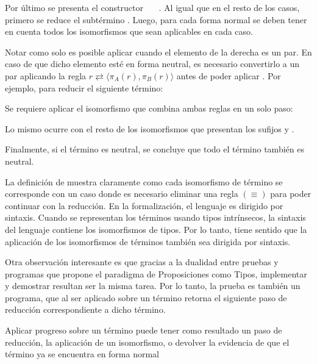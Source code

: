 
Por último se presenta el constructor \const{[}~~\const{]≡}~.
Al igual que en el resto de los casos, primero se reduce el subtérmino .
Luego, para cada forma normal se deben tener en cuenta todos los isomorfismos que sean aplicables en cada caso.


Notar como solo es posible aplicar  cuando el elemento de la derecha es un par.
En caso de que dicho elemento esté en forma neutral, es necesario convertirlo a un par aplicando la regla $r \rightleftarrows \langle \pi_A (r), \pi_B(r) \rangle$ antes de poder aplicar .
Por ejemplo, para reducir el siguiente término:


Se requiere aplicar el isomorfismo  que combina ambas reglas en un solo paso:


Lo mismo ocurre con el resto de los isomorfismos que presentan los sufijos  y \const{$\eta$}.

Finalmente, si el término  es neutral, se concluye que todo el término también es neutral.

La definición de  muestra claramente como cada isomorfismo de término se corresponde con un caso donde es necesario eliminar una regla $(\equiv)$ para poder continuar con la reducción.
En la formalización, el lenguaje es dirigido por sintaxis.
Cuando se representan los términos usando tipos intrínsecos, la sintaxis del lenguaje contiene los isomorfismos de tipos.
Por lo tanto, tiene sentido que la aplicación de los isomorfismos de términos también sea dirigida por sintaxis.

Otra observación interesante es que gracias a la dualidad entre pruebas y programas que propone el paradigma de Proposiciones como Tipos, implementar y demostrar resultan ser la misma tarea.
Por lo tanto, la prueba  es también un programa, que al ser aplicado sobre un término retorna el siguiente paso de reducción correspondiente a dicho término.

\begin{example}
	Aplicar progreso sobre un término puede tener como resultado un paso de reducción, la aplicación de un isomorfismo, o devolver la evidencia de que el término ya se encuentra en forma normal
\end{example}

